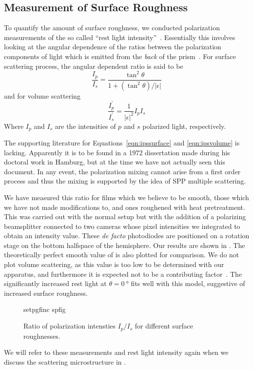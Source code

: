 \subsection{Measurement of Surface Roughness}
To quantify the amount of surface roughness, we conducted polarization
measurements of the so called ``rest light
intensity''~\cite{horstmann1977multiple}.  Essentially this involves
looking at the angular dependence of the ratios between the polarization
components of light which is emitted from the \textit{back} of the
prism~\cite{kretschmann1972decay}.
For surface scattering process, the angular dependent ratio is said to be
\begin{equation}
\frac{I_p}{I_s} = \frac{\tan^2\theta}{1+(\tan^2\theta)/|\epsilon|}
\label{eqn:ipssurface}
\end{equation}
and for volume scattering
\begin{equation}
\frac{I^\prime_p}{I^\prime_s} = \frac{1}{|\epsilon|^2} I_p I_s
\label{eqn:ipsvolume}
\end{equation}
Where $I_p$ and $I_s$ are the intensities of $p$ and $s$ polarized light,
respectively.

The supporting literature for Equations~\ref{eqn:ipssurface} and
\ref{eqn:ipsvolume} is lacking.  Apparently it is to be found in a 1972
dissertation  made during his doctoral work in Hamburg, but
at the time we have not actually seen this document.  In any event, the
polarization mixing cannot arise from a first order process and thus
the mixing is supported by the idea of SPP multiple scattering.

We have measured this ratio for films which we believe to be smooth, those
which we have not made modifications to, and ones roughened with heat
pretreatment.  This was carried out with the normal setup but with the
addition of a polarizing beamsplitter connected to two cameras whose pixel
intensities we integrated to obtain an intensity value.  These \textit{de
facto} photodiodes are positioned on a rotation stage on the bottom
halfspace of the hemisphere.  Our results are shown in .
The theoretically perfect smooth value of  is also
plotted for comparison.  We do not plot volume scattering, as this value is
too low to be determined with our apparatus, and furthermore it is expected
not to be a contributing factor~\cite{kretschmann1972decay}.  The
significantly increased rest light at $\theta=\SI{0}{\degree}$ fits well
with this model, suggestive of increased surface roughness.
\begin{figure}[ht]
 \centering
 {setpgfinc}
 {spfig}
 \caption{Ratio of polarization intensties $I_p/I_s$ for different
 surface roughnesses.}
 \label{fig:spratio}
\end{figure}

We will refer to these measurements and rest light intensity again when we
discuss the scattering microstructure in .

